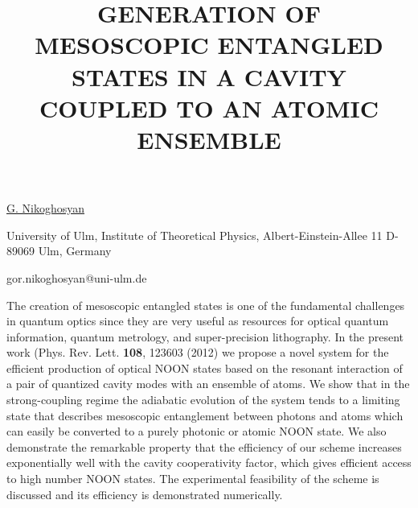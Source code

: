 \title{GENERATION OF MESOSCOPIC ENTANGLED STATES IN A CAVITY COUPLED TO AN ATOMIC ENSEMBLE}

\underline{G. Nikoghosyan} 

{\normalsize{\vspace{-4mm}
University of Ulm,
Institute of Theoretical Physics,
Albert-Einstein-Allee 11
D-89069 Ulm, Germany

\email gor.nikoghosyan@uni-ulm.de}}

The creation of mesoscopic entangled states is one of the
fundamental challenges in quantum optics since they are very useful as
resources for optical quantum information, quantum metrology, and
super-precision lithography. In the present work (Phys. Rev. Lett. \textbf{108}, 123603 (2012) we
propose a novel system for the efficient production of optical NOON states
based on the resonant interaction of a pair of quantized cavity modes with
an ensemble of atoms. We show that in the strong-coupling regime the
adiabatic evolution of the system tends to a limiting state that describes
mesoscopic entanglement between photons and atoms which can easily be
converted to a purely photonic or atomic NOON state. We also demonstrate the
remarkable property that the efficiency of our scheme increases
exponentially well with the cavity cooperativity factor, which gives
efficient access to high number NOON states. The experimental feasibility of
the scheme is discussed and its efficiency is demonstrated numerically.

\vspace{\baselineskip} 